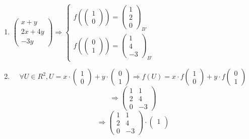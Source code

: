 \documentclass[notitlepage]{math}
\begin{document}
\begin{enumerate}[label=\protect\circled{\arabic*}]
    \item $\begin{pmatrix}
        x + y \\
        2x + 4y \\
        -3y
    \end{pmatrix} \Rightarrow \begin{cases}
        f(\begin{pmatrix} 1 \\ 0 \end{pmatrix}) = {\begin{pmatrix} 1 \\ 2 \\ 0 \end{pmatrix}}_{B'} \\
        f(\begin{pmatrix} 0 \\ 1 \end{pmatrix}) = {\begin{pmatrix} 1 \\ 4 \\ -3 \end{pmatrix}}_{B'}
    \end{cases}$
    \item \[\forall U \in R^2, U = x \cdot \begin{pmatrix} 1 \\ 0 \end{pmatrix} + y \cdot \begin{pmatrix} 0 \\ 1 \end{pmatrix} \Rightarrow f(U) = x \cdot f \begin{pmatrix} 1 \\ 0 \end{pmatrix} + y \cdot f \begin{pmatrix} 0 \\ 1 \end{pmatrix}\]
    \[ \Rightarrow \begin{pmatrix}
        1 & 1 \\
        2 & 4 \\
        0 & -3
    \end{pmatrix}\]
    \[ \Rightarrow \begin{pmatrix}
        1 & 1 \\
        2 & 4 \\
        0 & -3
    \end{pmatrix} \cdot \begin{pmatrix}
        1 \\

\end{pmatrix}\]
\end{enumerate}
\end{document}
